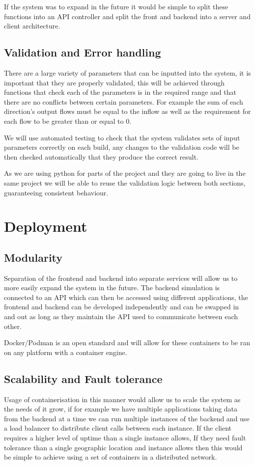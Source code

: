 \documentclass{article}
\begin{document}
If the system was to expand in the future it would be simple to split these 
functions into an API controller and split the front and backend into a 
server and client architecture.

\subsection{Validation and Error handling}

There are a large variety of parameters that can be inputted into the system, it is 
important that they are properly validated, this will be achieved through functions 
that check each of the parameters is in the required range and that there are no 
conflicts between certain parameters. For example the sum of each direction's output 
flows must be equal to the inflow as well as the requirement for each flow to be 
greater than or equal to 0. 

We will use automated testing to check that the system validates sets of input 
parameters correctly on each build, any changes to the validation code will be then 
checked automatically that they produce the correct result. 

As we are using python for parts of the project and they are going to live 
in the same project we will be able to reuse the validation logic between both 
sections, guaranteeing consistent behaviour.


\section{Deployment}

\subsection{Modularity}
Separation of the frontend and backend into separate services will allow us to more 
easily expand the system in the future. The backend simulation is connected to an API 
which can then be accessed using different applications, the frontend and backend can 
be developed independently and can be swapped in and out as long as they maintain the 
API used to communicate between each other.

Docker/Podman is an open standard and will allow for these containers to be ran 
on any platform with a container engine.

\subsection{Scalability and Fault tolerance}
Usage of containerisation in this manner would allow us to scale the system as the 
needs of it grow, if for example we have multiple applications taking data from the 
backend at a time we can run multiple instances of the backend and use a load balancer 
to distribute client calls between each instance. If the client requires a higher level 
of uptime than a single instance allows, If they need fault tolerance than a single 
geographic location and instance allows then this would be simple to achieve using a 
set of containers in a distributed network.
\end{document}
